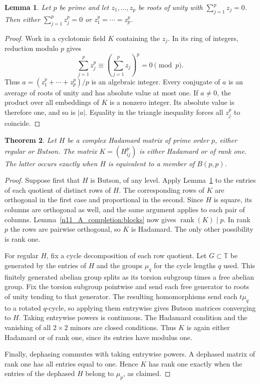 \documentclass[11pt,a4paper]{article}
\newtheorem{theorem}{Theorem}[section]
\newtheorem{lemma}[theorem]{Lemma}
\numberwithin{equation}{section}
\begin{document}
\begin{lemma}\label{prime:sum}
Let $p$ be prime and let $z_1,\ldots,z_p$ be roots of unity with $\sum_{j=1}^p z_j=0$. Then either $\sum_{j=1}^p z_j^p=0$ or $z_1^p=\cdots=z_p^p$.
\end{lemma}
\begin{proof}
Work in a cyclotomic field $K$ containing the $z_j$. In its ring of integers, reduction modulo $p$ gives
$$\sum_{j=1}^p z_j^p\equiv\left(\sum_{j=1}^p z_j\right)^p=0\pmod p.$$
Thus $a=(z_1^p+\cdots+z_p^p)/p$ is an algebraic integer. Every conjugate of $a$ is an average of roots of unity and has absolute value at most one. If $a\ne0$, the product over all embeddings of $K$ is a nonzero integer. Its absolute value is therefore one, and so is $|a|$. Equality in the triangle inequality forces all $z_j^p$ to coincide.
\end{proof}

\begin{theorem}\label{prime:power}
Let $H$ be a complex Hadamard matrix of prime order $p$, either regular or Butson. The matrix $K=(H_{ij}^p)$ is either Hadamard or of rank one. The latter occurs exactly when $H$ is equivalent to a member of $B(p,p)$.
\end{theorem}
\begin{proof}
Suppose first that $H$ is Butson, of any level. Apply Lemma~\ref{prime:sum} to the entries of each quotient of distinct rows of $H$. The corresponding rows of $K$ are orthogonal in the first case and proportional in the second. Since $H$ is square, its columns are orthogonal as well, and the same argument applies to each pair of columns. Lemma~\ref{n11_A_completion:blocks} now gives $\operatorname{rank}(K)\mid p$. In rank $p$ the rows are pairwise orthogonal, so $K$ is Hadamard. The only other possibility is rank one.

For regular $H$, fix a cycle decomposition of each row quotient. Let $G\subset\mathbb T$ be generated by the entries of $H$ and the groups $\mu_q$ for the cycle lengths $q$ used. This finitely generated abelian group splits as its torsion subgroup times a free abelian group. Fix the torsion subgroup pointwise and send each free generator to roots of unity tending to that generator. The resulting homomorphisms send each $t\mu_q$ to a rotated $q$-cycle, so applying them entrywise gives Butson matrices converging to $H$. Taking entrywise powers is continuous. The Hadamard condition and the vanishing of all $2\times2$ minors are closed conditions. Thus $K$ is again either Hadamard or of rank one, since its entries have modulus one.

Finally, dephasing commutes with taking entrywise powers. A dephased matrix of rank one has all entries equal to one. Hence $K$ has rank one exactly when the entries of the dephased $H$ belong to $\mu_p$, as claimed.
\end{proof}
\end{document}
